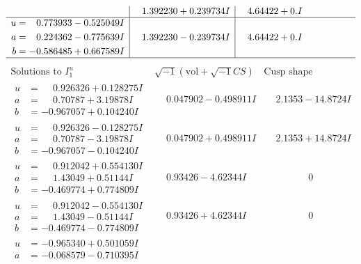 \documentclass[1p]{elsarticle_modified}
\theoremstyle{definition}
\newcommand{\I}{\sqrt{-1}}
\begin{document}
$$\begin{array}{c|c|c}
 & \phantom{-}1.392230 + 0.239734 I & \phantom{-}4.64422 + 0. I\phantom{ +0.000000I} \\ \hline\begin{aligned}
u &= \phantom{-}0.773933 - 0.525049 I \\
a &= \phantom{-}0.224362 - 0.775639 I \\
b &= -0.586485 + 0.667589 I\end{aligned}
 & \phantom{-}1.392230 - 0.239734 I & \phantom{-}4.64422 + 0. I\phantom{ +0.000000I}\\
 \hline 
 \end{array}$$\newpage$$\begin{array}{c|c|c}  
\text{Solutions to }I^u_{1}& \I (\text{vol} + \sqrt{-1}CS) & \text{Cusp shape}\\
 \hline 
\begin{aligned}
u &= \phantom{-}0.926326 + 0.128275 I \\
a &= \phantom{-}0.70787 + 3.19878 I \\
b &= -0.967057 + 0.104240 I\end{aligned}
 & \phantom{-}0.047902 - 0.498911 I & \phantom{-}2.1353 - 14.8724 I \\ \hline\begin{aligned}
u &= \phantom{-}0.926326 - 0.128275 I \\
a &= \phantom{-}0.70787 - 3.19878 I \\
b &= -0.967057 - 0.104240 I\end{aligned}
 & \phantom{-}0.047902 + 0.498911 I & \phantom{-}2.1353 + 14.8724 I \\ \hline\begin{aligned}
u &= \phantom{-}0.912042 + 0.554130 I \\
a &= \phantom{-}1.43049 + 0.51144 I \\
b &= -0.469774 + 0.774809 I\end{aligned}
 & \phantom{-}0.93426 - 4.62344 I & \phantom{-0.000000 } 0 \\ \hline\begin{aligned}
u &= \phantom{-}0.912042 - 0.554130 I \\
a &= \phantom{-}1.43049 - 0.51144 I \\
b &= -0.469774 - 0.774809 I\end{aligned}
 & \phantom{-}0.93426 + 4.62344 I & \phantom{-0.000000 } 0 \\ \hline\begin{aligned}
u &= -0.965340 + 0.501059 I \\
a &= -0.068579 - 0.710395 I \\

\end{aligned}
\end{array}$$
\end{document}
